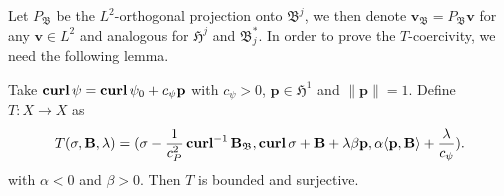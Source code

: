 \documentclass[../master_thesis.tex]{subfiles}
\begin{document}
Let $P_\mathfrak{B}$ be the $L^2$-orthogonal projection onto $\mathfrak{B}^j$, 
we then denote $\mathbf{v}_\mathfrak{B} = P_\mathfrak{B} \mathbf{v}$ for any $\mathbf{v} \in L^2$ 
and analogous for 
$\mathfrak{H}^j$ and $\mathfrak{B}^*_j$.
In order to prove the $T$-coercivity, we need the following lemma.
\begin{lemma}\label{lem:T_for_T_coercivity_surjective}
    Take $\veccurl \psi = \veccurl \psi_0 + c_\psi \mathbf{p}$ with $c_\psi > 0$,
    $\mathbf{p} \in \mathfrak{H}^1$ and $\lVert \mathbf{p}\rVert =1$.
    Define $T:X \rightarrow X$ as 
    \begin{align*}
        T(\sigma, \mathbf{B},\lambda)
        = (\sigma - \frac{1}{c_P^2}\veccurl^{-1}\mathbf{B}_\mathfrak{B}, \veccurl \sigma + \mathbf{B} + \lambda \beta \mathbf{p},
            \alpha \langle \mathbf{p}, \mathbf{B} \rangle  
            + \frac{\lambda}{c_\psi}).
    \end{align*}
    with $\alpha < 0$ and $\beta>0$.
    Then $T$ is bounded and surjective. 
\end{lemma}
\end{document}
